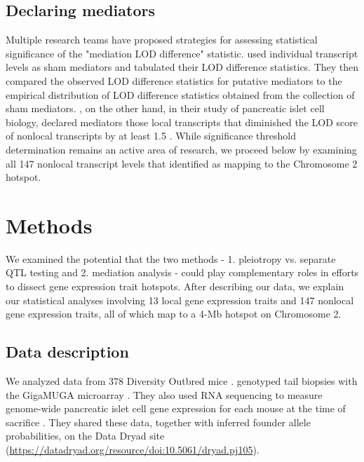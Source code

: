\documentclass{article}
\begin{document}
\subsection{Declaring mediators}

Multiple research teams have proposed strategies for assessing statistical significance of the "mediation LOD difference" statistic. \citet{chick2016defining} used individual transcript levels as sham mediators and tabulated their LOD difference statistics. They then compared the observed LOD difference statistics for putative mediators to the empirical distribution of LOD difference statistics obtained from the collection of sham mediators. \citet{keller2018genetic}, on the other hand, in their study of pancreatic islet cell biology, declared mediators those local transcripts that diminished the LOD score of nonlocal transcripts by at least 1.5 \citep{keller2018genetic}. While significance threshold determination remains an active area of research, we proceed below by examining all 147 nonlocal transcript levels that \citet{keller2018genetic} identified as mapping to the Chromosome 2 hotspot.
 


\section{Methods}

We examined the potential that the two methods - 1. pleiotropy vs. separate QTL testing and 2. mediation analysis - could play complementary roles in efforts to dissect gene expression trait hotspots. After describing our data, we explain our statistical analyses involving 13 local gene expression traits and 147 nonlocal gene expression traits, all of which map to a 4-Mb hotspot on Chromosome 2.

\subsection{Data description}

We analyzed data from 378 Diversity Outbred mice \citep{keller2018genetic}. \citet{keller2018genetic} genotyped tail biopsies with the GigaMUGA microarray \citep{morgan2015mouse}. They also used RNA sequencing to measure genome-wide pancreatic islet cell gene expression for each mouse at the time of sacrifice \citep{keller2018genetic}. They shared these data, together with inferred founder allele probabilities, on the Data Dryad site (\url{https://datadryad.org/resource/doi:10.5061/dryad.pj105}). 
\end{document}
